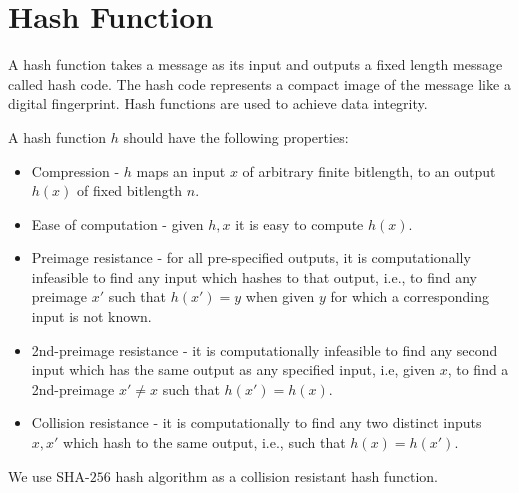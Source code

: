 \section{Hash Function}
	A hash function takes a message as its input and outputs a fixed length message called hash code.
	The hash code represents a compact image of the message like a digital fingerprint.
	Hash functions are used to achieve data integrity.

	A hash function $h$ should have the following properties:
	\begin{itemize}
		\item Compression - $h$ maps an input $x$ of arbitrary finite bitlength, to an output $h(x)$ of fixed bitlength $n$.
		\item Ease of computation - given $h,x$ it is easy to compute $h(x)$.
		\item Preimage resistance - for all pre-specified outputs, it is computationally infeasible to find any input which hashes to that output, i.e., to find any preimage $x'$ such that $h(x') = y$ when given $y$ for which a corresponding input is not known.
		\item 2nd-preimage resistance - it is computationally infeasible to find any second input which has the same output as any specified input, i.e, given $x$, to find a 2nd-preimage $x' \neq x$ such that $h(x') = h(x)$.
		\item Collision resistance - it is computationally to find any two distinct inputs $x,x'$ which hash to the same output, i.e., such that $h(x) = h(x')$.
	\end{itemize} 

	We use SHA-$256$\cite{SHA256} hash algorithm as a collision resistant hash function.

